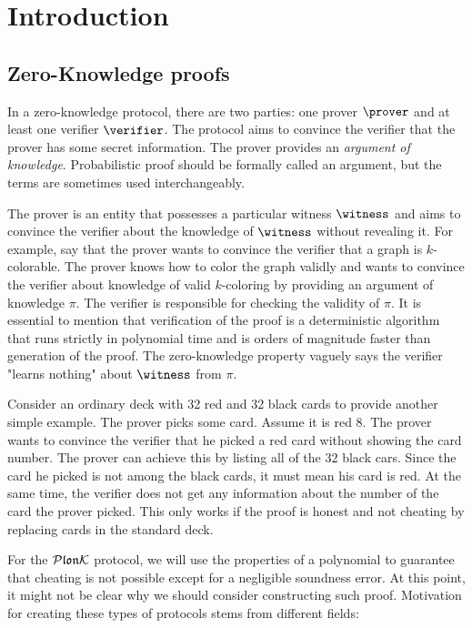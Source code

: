 \chapter*{Introduction}

\section*{Zero-Knowledge proofs}
In a zero-knowledge protocol, there are two parties: one prover $\prover$ and at least one verifier $\verifier$. The protocol aims to convince the verifier that the prover has some secret information. The prover provides an \textit{argument of knowledge}. Probabilistic proof should be formally called an argument, but the terms are sometimes used interchangeably.

The prover is an entity that possesses a particular witness $\witness$ and aims to convince the verifier about the knowledge of $\witness$ without revealing it. For example, say that the prover wants to convince the verifier that a graph is $k$-colorable. The prover knows how to color the graph validly and wants to convince the verifier about knowledge of valid $k$-coloring by providing an argument of knowledge $\pi$. The verifier is responsible for checking the validity of $\pi$. It is essential to mention that verification of the proof is a deterministic algorithm that runs strictly in polynomial time and is orders of magnitude faster than generation of the proof. The zero-knowledge property vaguely says the verifier "learns nothing" about $\witness$ from $\pi$. 

\begin{example}
    Consider an ordinary deck with 32 red and 32 black cards to provide another simple example. The prover picks some card. Assume it is red 8. The prover wants to convince the verifier that he picked a red card without showing the card number. The prover can achieve this by listing all of the 32 black cars. Since the card he picked is not among the black cards, it must mean his card is red. At the same time, the verifier does not get any information about the number of the card the prover picked. This only works if the proof is honest and not cheating by replacing cards in the standard deck. 
\end{example}

For the $\mathcal{P}\mathfrak{lon}\mathcal{K}$ protocol, we will use the properties of a polynomial to guarantee that cheating is not possible except for a negligible soundness error. At this point, it might not be clear why we should consider constructing such proof. Motivation for creating these types of protocols stems from different fields:

